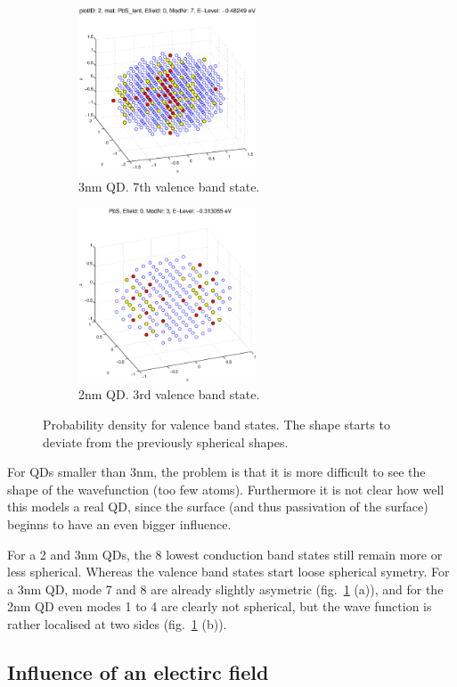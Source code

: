 \begin{figure}
	\centering
	\begin{subfigure}{200px}
		\includegraphics[width=200px]{Fig/Plots/r15VBmod7}
		\caption{3nm QD. 7th valence band state.}
	\end{subfigure}
	\begin{subfigure}{200px}
		\includegraphics[width=200px]{Fig/Plots/r1VBmod3}
		\caption{2nm QD. 3rd valence band state.}
	\end{subfigure}
	\caption{Probability density for valence band states. The shape starts to deviate from the previously spherical shapes.}
	\label{fig:asymWaveFn}
\end{figure}


For QDs smaller than 3nm, the problem is that it is more difficult to see the shape of the wavefunction (too few atoms). Furthermore it is not clear how well this models a real QD, since the surface (and thus passivation of the surface) beginns to have an even bigger influence.
	
For a 2 and 3nm QDs, the 8 lowest conduction band states still remain more or less spherical. Whereas the valence band states start loose spherical symetry. For a 3nm QD, mode 7 and 8 are already slightly asymetric (fig.~\ref{fig:asymWaveFn} (a)), and for the 2nm QD even modes 1 to 4 are clearly not spherical, but the wave function is rather localised at two sides (fig.~\ref{fig:asymWaveFn} (b)).
	
\FloatBarrier
\subsection{Influence of an electirc field}


